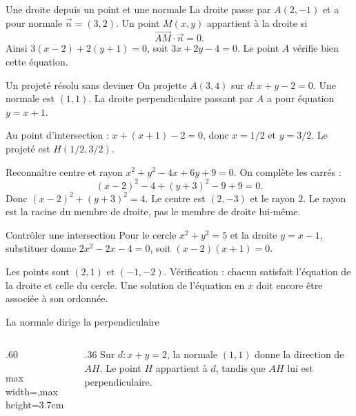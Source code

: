 \documentclass[aspectratio=169,12pt]{beamer}
\begin{document}
\renewcommand{\slidekind}{COMPRENDRE}
\begin{frame}[t,fragile]{Une droite depuis un point et une normale}
La droite passe par $A(2,-1)$ et a pour normale $\vec n=(3,2)$. Un point $M(x,y)$ appartient à la droite si\[\overrightarrow{AM}\cdot\vec n=0.\] Ainsi $3(x-2)+2(y+1)=0$, soit $3x+2y-4=0$. Le point $A$ vérifie bien cette équation.
\end{frame}
\renewcommand{\slidekind}{MÉTHODE \& EXEMPLE}
\begin{frame}[t,fragile]{Un projeté résolu sans deviner}
On projette $A(3,4)$ sur $d:x+y-2=0$. Une normale est $(1,1)$. La droite perpendiculaire passant par $A$ a pour équation $y=x+1$.\medskip\par Au point d’intersection : $x+(x+1)-2=0$, donc $x=1/2$ et $y=3/2$. Le projeté est $H(1/2,3/2)$.
\end{frame}
\renewcommand{\slidekind}{COMPRENDRE}
\begin{frame}[t,fragile]{Reconnaître centre et rayon}
$x^2+y^2-4x+6y+9=0$. On complète les carrés :\[(x-2)^2-4+(y+3)^2-9+9=0.\] Donc $(x-2)^2+(y+3)^2=4$. Le centre est $(2,-3)$ et le rayon $2$. Le rayon est la racine du membre de droite, pas le membre de droite lui-même.
\end{frame}
\renewcommand{\slidekind}{À RETENIR}
\begin{frame}[t,fragile]{Contrôler une intersection}
Pour le cercle $x^2+y^2=5$ et la droite $y=x-1$, substituer donne $2x^2-2x-4=0$, soit $(x-2)(x+1)=0$.\medskip\par Les points sont $(2,1)$ et $(-1,-2)$. Vérification : chacun satisfait l’équation de la droite et celle du cercle. Une solution de l’équation en $x$ doit encore être associée à son ordonnée.
\end{frame}
\renewcommand{\slidekind}{COMPRENDRE}
\begin{frame}[t,fragile]{La normale dirige la perpendiculaire}
\begin{columns}[c,onlytextwidth]\begin{column}{.60\textwidth}\centering\begin{adjustbox}{max width=\linewidth,max height=3.7cm}\end{adjustbox}\end{column}\begin{column}{.36\textwidth} Sur $d:x+y=2$, la normale $(1,1)$ donne la direction de $AH$. Le point $H$ appartient à $d$, tandis que $AH$ lui est perpendiculaire.\end{column}\end{columns}
\end{frame}
\end{document}

